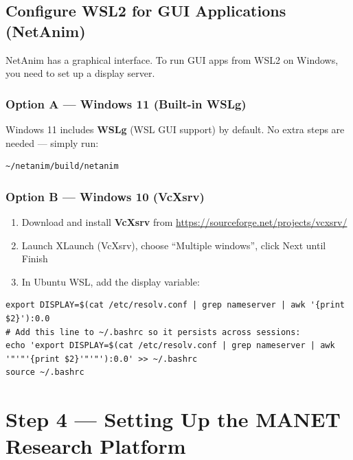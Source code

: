 \documentclass[12pt,a4paper]{article}
\begin{document}
\subsection{Configure WSL2 for GUI Applications (NetAnim)}

NetAnim has a graphical interface. To run GUI apps from WSL2 on Windows, you need to set up a display server.

\subsubsection{Option A — Windows 11 (Built-in WSLg)}

Windows 11 includes \textbf{WSLg} (WSL GUI support) by default. No extra steps are needed — simply run:

\begin{lstlisting}[style=bash, caption={Launch NetAnim (Windows 11 with WSLg)}]
~/netanim/build/netanim
\end{lstlisting}

\subsubsection{Option B — Windows 10 (VcXsrv)}

\begin{enumerate}[leftmargin=1.5em]
  \item Download and install \textbf{VcXsrv} from \url{https://sourceforge.net/projects/vcxsrv/}
  \item Launch XLaunch (VcXsrv), choose ``Multiple windows'', click Next until Finish
  \item In Ubuntu WSL, add the display variable:
\end{enumerate}

\begin{lstlisting}[style=bash, caption={Set DISPLAY variable (Windows 10 / VcXsrv)}]
export DISPLAY=$(cat /etc/resolv.conf | grep nameserver | awk '{print $2}'):0.0
# Add this line to ~/.bashrc so it persists across sessions:
echo 'export DISPLAY=$(cat /etc/resolv.conf | grep nameserver | awk '"'"'{print $2}'"'"'):0.0' >> ~/.bashrc
source ~/.bashrc
\end{lstlisting}


\section{Step 4 — Setting Up the MANET Research Platform}
\end{document}
